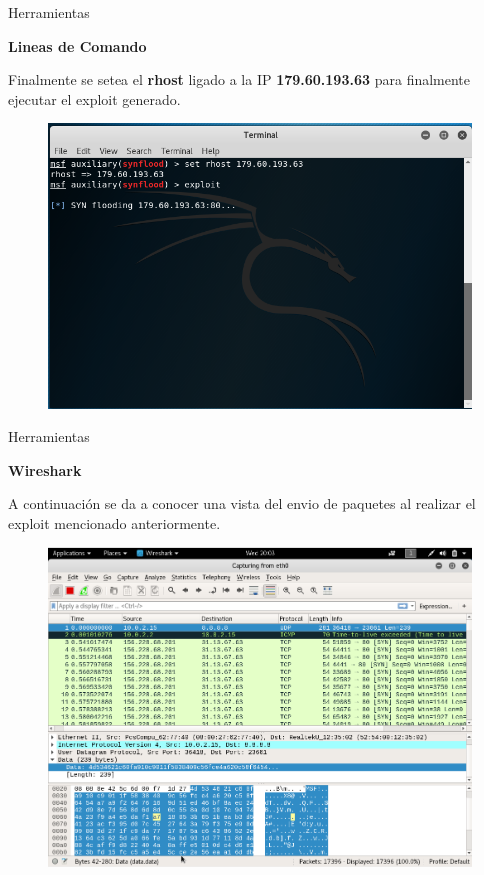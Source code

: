 \begin{frame}[t,fragile]{Herramientas}

\textbf{Lineas de Comando}

\bigskip

Finalmente se setea el \textbf{rhost} ligado a la IP \textbf{179.60.193.63} para finalmente ejecutar el exploit generado.

\begin{figure}[!h]
    \centering
    \includegraphics[scale=0.35]{metaesploit.png}
    \label{fig:my_label}
    \end{figure}

\end{frame}



\begin{frame}[t,fragile]{Herramientas}

\textbf{Wireshark}

\bigskip

A continuación se da a conocer una vista del envio de paquetes al realizar el exploit mencionado anteriormente.

\begin{figure}[!h]
    \centering
    \includegraphics[scale=0.25]{wireshark.png}
    \label{fig:my_label}
    \end{figure}

\end{frame}



